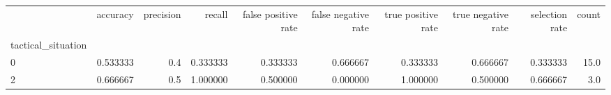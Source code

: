 \begin{tabular}{lrrrrrrrrr}
\toprule
{} &  accuracy &  precision &    recall &  false positive rate &  false negative rate &  true positive rate &  true negative rate &  selection rate &  count \\
tactical\_situation &           &            &           &                      &                      &                     &                     &                 &        \\
\midrule
0                  &  0.533333 &        0.4 &  0.333333 &             0.333333 &             0.666667 &            0.333333 &            0.666667 &        0.333333 &   15.0 \\
2                  &  0.666667 &        0.5 &  1.000000 &             0.500000 &             0.000000 &            1.000000 &            0.500000 &        0.666667 &    3.0 \\
\bottomrule
\end{tabular}
